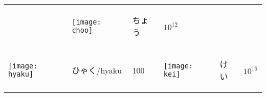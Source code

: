\documentclass[a4paper,12pt]{extarticle}
\begin{document}
\begin{longtable}{|lll|lll|}
	                                   &
	\begin{minipage}{0.2\textwidth}
		\centerline{
			\texttt{[image: choo]}
		}
	\end{minipage}
	                                   &
	\begin{CJK}{UTF8}{min}ちょう\end{CJK}
	                                   &
	$10^{12}$
	\\
	\begin{minipage}{0.2\textwidth}
		\centerline{
			\texttt{[image: hyaku]}
		}
	\end{minipage}
	                                   &
	\begin{CJK}{UTF8}{min}ひゃく/hyaku\end{CJK}
	                                   &
	100

	                                   &
	\begin{minipage}{0.2\textwidth}
		\centerline{
			\texttt{[image: kei]}
		}
	\end{minipage}
	                                   &
	\begin{CJK}{UTF8}{min}けい\end{CJK}
	                                   &
	$10^{16}$
	\\
\end{longtable}
\end{document}
